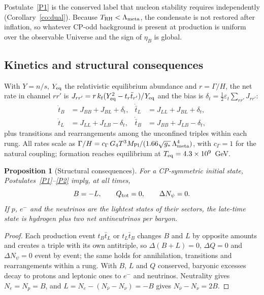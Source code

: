 \documentclass[11pt]{article}
\newtheorem{proposition}[theorem]{Proposition}
\newcommand{\Lm}{\Lambda_{\rm meta}}
\newcommand{\Np}{N_\psi}
\newcommand{\TRH}{T_{\rm RH}}
\begin{document}
\noindent Postulate~\ref{P1} is the conserved label that nucleon stability requires independently (Corollary~\ref{co:dual}). Because $\TRH<\Lm$, the condensate is not restored after inflation, so whatever CP-odd background is present at production is uniform over the observable Universe and the sign of $\eta_B$ is global.

\subsection{Kinetics and structural consequences}

With $Y=n/s$, $Y_{\rm eq}$ the relativistic equilibrium abundance and $r=\Gamma/H$, the net rate in channel $rr'$ is $J_{rr'}=r\,k_t(Y_{\rm eq}^2-t_r\bar t_{r'})/Y_{\rm eq}$ and the bias is $\delta_t=\tfrac12\varepsilon_t\sum_{rr'}J_{rr'}$:
\begin{align}
\dot t_B&=J_{BB}+J_{BL}+\delta_t, & \dot{\bar t}_L&=J_{LL}+J_{BL}+\delta_t,\\
\dot t_L&=J_{LL}+J_{LB}-\delta_t, & \dot{\bar t}_B&=J_{BB}+J_{LB}-\delta_t,
\end{align}
plus transitions and rearrangements among the unconfined triples within each rung. All rates scale as $\Gamma/H=c_\Gamma\,G_4T^3M_{\rm Pl}/(1.66\sqrt{g_*}\,\Lm^4)$, with $c_\Gamma=1$ for the natural coupling; formation reaches equilibrium at $T_{\rm eq}=4.3\times10^9$~GeV.

\begin{proposition}[Structural consequences]\label{pr:struct}
For a CP-symmetric initial state, Postulates~\ref{P1}--\ref{P2} imply, at all times,
\begin{equation}
B=-L,\qquad Q_{\rm tot}=0,\qquad \Delta\Np=0 .
\end{equation}
If $p$, $e^-$ and the neutrinos are the lightest states of their sectors, the late-time state is hydrogen plus two net antineutrinos per baryon.
\end{proposition}
\begin{proof}
Each production event $t_B\bar t_L$ or $t_L\bar t_B$ changes $B$ and $L$ by opposite amounts and creates a triple with its own antitriple, so $\Delta(B+L)=0$, $\Delta Q=0$ and $\Delta\Np=0$ event by event; the same holds for annihilation, transitions and rearrangements within a rung. With $B$, $L$ and $Q$ conserved, baryonic excesses decay to protons and leptonic ones to $e^-$ and neutrinos. Neutrality gives $N_e=N_p=B$, and $L=N_e-(N_{\bar\nu}-N_\nu)=-B$ gives $N_{\bar\nu}-N_\nu=2B$.
\end{proof}
\end{document}
